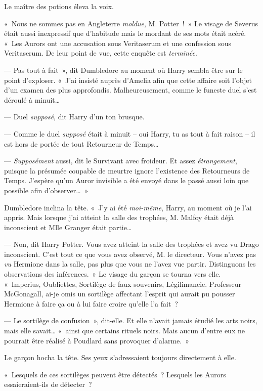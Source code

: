 Le maître des potions éleva la voix.

«~Nous ne sommes pas en Angleterre \emph{moldue}, M. Potter~!~» Le visage de Severus était aussi inexpressif que d'habitude mais le mordant de ses mots était acéré. «~Les Aurors ont une accusation sous Veritaserum et une confession sous Veritaserum. De leur point de vue, cette enquête est \emph{terminée}.

--- Pas tout à fait~», dit Dumbledore au moment où Harry sembla être sur le point d'exploser. «~J'ai insisté auprès d'Amelia afin que cette affaire soit l'objet d'un examen des plus approfondis. Malheureusement, comme le funeste duel s'est déroulé à minuit…

--- Duel \emph{supposé}, dit Harry d'un ton brusque.

--- Comme le duel \emph{supposé} était à minuit -- oui Harry, tu as tout à fait raison -- il est hors de portée de tout Retourneur de Temps…

--- \emph{Supposément} aussi, dit le Survivant avec froideur. Et assez \emph{étrangement}, puisque la présumée coupable de meurtre ignore l'existence des Retourneurs de Temps. J'espère qu'un Auror invisible a été envoyé dans le passé aussi loin que possible afin d'observer…~»

Dumbledore inclina la tête. «~J'y ai été \emph{moi-même}, Harry, au moment où je l'ai appris. Mais lorsque j'ai atteint la salle des trophées, M. Malfoy était déjà inconscient et Mlle Granger était partie…

--- Non, dit Harry Potter. Vous avez atteint la salle des trophées et avez vu Drago inconscient. C'est tout ce que vous avez observé, M. le directeur. Vous n'avez pas \emph{vu} Hermione dans la salle, pas plus que vous ne l'avez vue partir. Distinguons les observations des inférences.~» Le visage du garçon se tourna vers elle. «~Imperius, Oubliettes, Sortilège de faux souvenirs, Légilimancie. Professeur McGonagall, ai-je omis un sortilège affectant l'esprit qui aurait pu pousser Hermione à faire ça ou à lui faire croire qu'elle l'a fait~?

--- Le sortilège de confusion~», dit-elle. Et elle n'avait jamais étudié les arts noirs, mais elle savait… «~ainsi que certains rituels noirs. Mais aucun d'entre eux ne pourrait être réalisé à Poudlard sans provoquer d'alarme.~»

Le garçon hocha la tête. Ses yeux s'adressaient toujours directement à elle.

«~Lesquels de ces sortilèges peuvent être détectés~? Lesquels les Aurors essaieraient-ils de détecter~?

